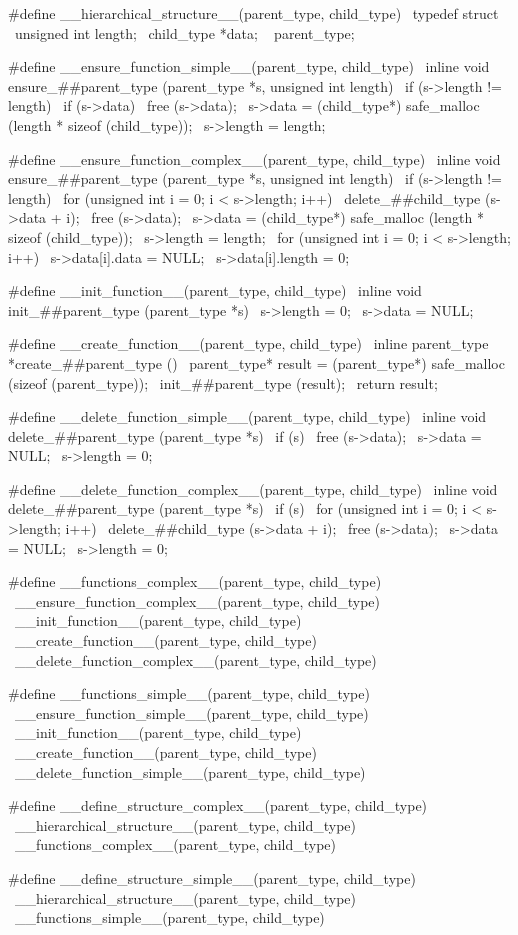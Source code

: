 \documentclass{article}
\begin{document}
\begin{ccode}
#define __hierarchical_structure__(parent_type, child_type) \
typedef struct { \
  unsigned int length; \
  child_type *data; \
} parent_type;

#define __ensure_function_simple__(parent_type, child_type) \
inline void ensure_##parent_type (parent_type *s, unsigned int length) { \
  if (s->length != length) { \
    if (s->data) \
      free (s->data); \
    s->data = (child_type*) safe_malloc (length * sizeof (child_type)); \
    s->length = length; \
  } \
}

#define __ensure_function_complex__(parent_type, child_type) \
inline void ensure_##parent_type (parent_type *s, unsigned int length) { \
  if (s->length != length) { \
    for (unsigned int i = 0; i < s->length; i++) \
      delete_##child_type (s->data + i); \
    free (s->data); \
    s->data = (child_type*) safe_malloc (length * sizeof (child_type)); \
    s->length = length; \
    for (unsigned int i = 0; i < s->length; i++) { \
      s->data[i].data = NULL; \
      s->data[i].length = 0; \
   } \
  } \
}

#define __init_function__(parent_type, child_type) \
inline void init_##parent_type (parent_type *s) { \
  s->length = 0; \
  s->data = NULL; \
}

#define __create_function__(parent_type, child_type) \
inline parent_type *create_##parent_type () { \
  parent_type* result = (parent_type*) safe_malloc (sizeof (parent_type)); \
  init_##parent_type (result); \
  return result; \
}

#define __delete_function_simple__(parent_type, child_type) \
inline void delete_##parent_type (parent_type *s) { \
  if (s) { \
    free (s->data); \
    s->data = NULL; \
    s->length = 0; \
  } \
}

#define __delete_function_complex__(parent_type, child_type) \
inline void delete_##parent_type (parent_type *s) { \
  if (s) { \
    for (unsigned int i = 0; i < s->length; i++) \
      delete_##child_type (s->data + i); \
    free (s->data); \
    s->data = NULL; \
    s->length = 0; \
  } \
}

#define __functions_complex__(parent_type, child_type) \
__ensure_function_complex__(parent_type, child_type) \
__init_function__(parent_type, child_type) \
__create_function__(parent_type, child_type) \
__delete_function_complex__(parent_type, child_type)

#define __functions_simple__(parent_type, child_type) \
__ensure_function_simple__(parent_type, child_type) \
__init_function__(parent_type, child_type) \
__create_function__(parent_type, child_type) \
__delete_function_simple__(parent_type, child_type)

#define __define_structure_complex__(parent_type, child_type) \
__hierarchical_structure__(parent_type, child_type) \
__functions_complex__(parent_type, child_type)

#define __define_structure_simple__(parent_type, child_type) \
__hierarchical_structure__(parent_type, child_type) \
__functions_simple__(parent_type, child_type)
\end{ccode}
\end{document}
